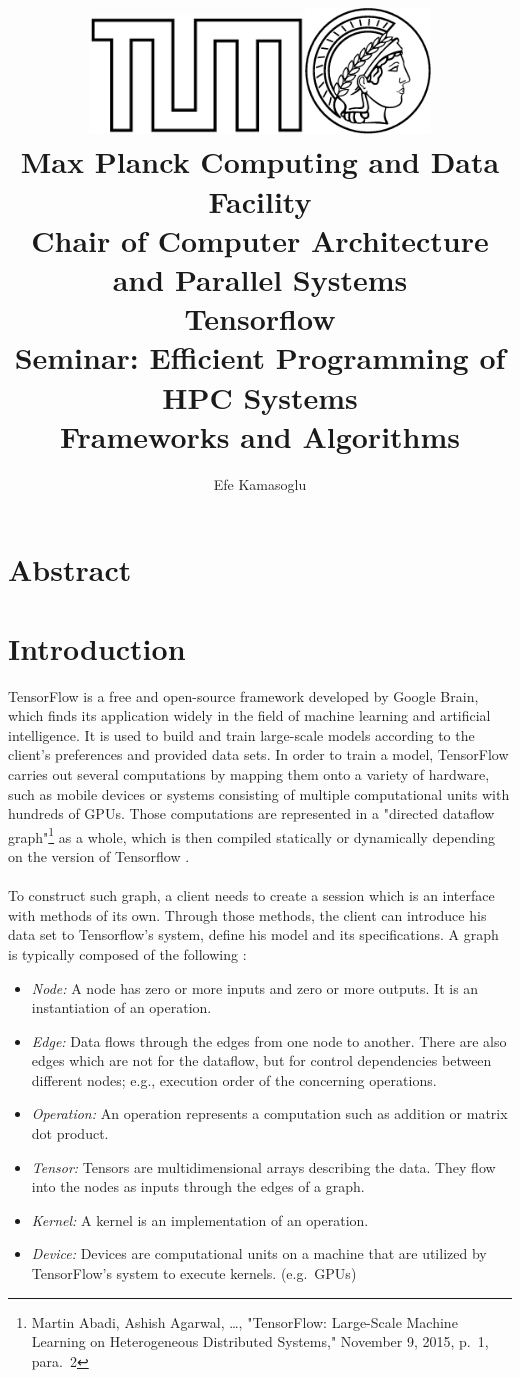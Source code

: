 \documentclass[ieeetran]{article}
\title{\includegraphics[width=0.43\textwidth]{tumlogo}\hspace{2ex}\includegraphics[width=0.25\textwidth]{maxlogo}\vspace{1ex}\\ \large \textbf{Max Planck Computing and Data Facility \\Chair of Computer Architecture and Parallel Systems} \vspace{10ex}\\ \huge Tensorflow \vspace{2ex}\\
\large Seminar: Efficient Programming of HPC Systems \\Frameworks and Algorithms\vspace{15ex}}
\author{Efe Kamasoglu}
\begin{document}
\maketitle

\pagebreak

\tableofcontents

\pagebreak

\section*{Abstract}



\pagebreak


\section{Introduction} %
\label{sec:introduction}
TensorFlow is a free and open-source framework developed by Google Brain, which finds its application widely in the field of machine learning and artificial intelligence. It is used to build and train large-scale models according to the client's preferences and provided data sets. In order to train a model, TensorFlow carries out several computations by mapping them onto a variety of hardware, such as mobile devices or systems consisting of multiple computational units with hundreds of GPUs. Those computations are represented in a "directed dataflow graph"\footnote{Martin Abadi, Ashish Agarwal, \ldots, "TensorFlow: Large-Scale Machine Learning on Heterogeneous Distributed Systems," November 9, 2015, p.\ 1, para.\ 2} as a whole, which is then compiled statically or dynamically depending on the version of Tensorflow \cite{first}. 
\\ \\To construct such graph, a client needs to create a session which is an interface with methods of its own. Through those methods, the client can introduce his data set to Tensorflow's system, define his model and its specifications. A graph is typically composed of the following \cite{first}:
\begin{itemize}
  \item \textit{Node:} A node has zero or more inputs and zero or more outputs. It is an instantiation of an operation.
\item \textit{Edge:} Data flows through the edges from one node to another. There are also edges which are not for the dataflow, but for control dependencies between different nodes; e.g., execution order of the concerning operations.
\item \textit{Operation:} An operation represents a computation such as addition or matrix dot product.
\item \textit{Tensor:} Tensors are multidimensional arrays describing the data. They flow into the nodes as inputs through the edges of a graph.
\item \textit{Kernel:} A kernel is an implementation of an operation.
\item \textit{Device:} Devices are computational units on a machine that are utilized by TensorFlow's system to execute kernels. (e.g.\ GPUs)
\end{itemize}
\end{document}

